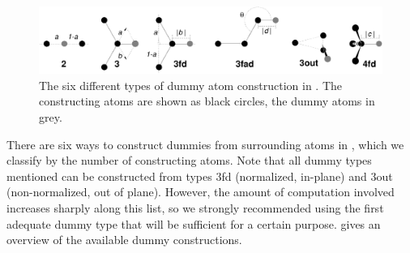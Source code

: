 \begin{figure}
\centerline{\includegraphics[width=15cm]{plots/dummies}}
\caption[Dummy atom construction.]{The six different types of dummy
atom construction in \protect{\gromacs}. The constructing atoms are
shown as black circles, the dummy atoms in grey.}
\label{fig:dummies}
\end{figure}

There are six ways to construct dummies from surrounding atoms in
{\gromacs}, which we classify by the number of constructing
atoms. Note that all dummy types mentioned can be constructed from
types 3fd (normalized, in-plane) and 3out (non-normalized, out of
plane). However, the amount of computation involved increases sharply
along this list, so we strongly recommended using the first adequate
dummy type that will be sufficient for a certain purpose.
 gives an overview of the available dummy constructions.

